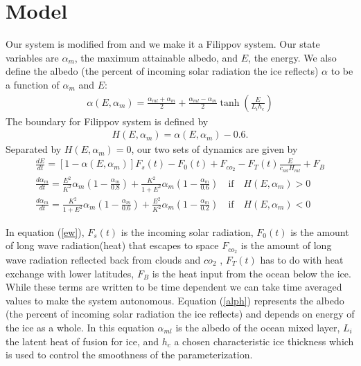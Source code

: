 \documentclass[10pt]{article}
\begin{document}
\section{Model}

Our system is modified from \cite{Eisenman09} and we make it a Filippov system. Our state variables are $\alpha_m$, the maximum attainable albedo, and $E$, the energy. We also define the albedo (the percent of incoming solar radiation the ice reflects) $\alpha$ to be a function of $\alpha_m$ and $E$:
\begin{align}
\alpha(E,\alpha_m)=\frac{\alpha_{ml}+\alpha_m}{2}+\frac{\alpha_{ml}-\alpha_m}{2}\tanh\left(\frac{E}{L_i h_{c}} \right) \label{alph}
\end{align}
The boundary for Filippov system is defined by
\begin{align}
H(E,\alpha_m)=\alpha(E,\alpha_m)-0.6 \label{H}.
\end{align}
Separated by $H(E,\alpha_m)=0$, our two sets of dynamics are given by
{\small
\begin{align}
&\frac{dE}{dt}=[1-\alpha(E,\alpha_{m})]F_s(t)-F_0(t)+F_{co_2}-F_T(t)\frac{E}{c_{ml} H_{ml}}+F_B & \label{ew}\\
&\frac{d \alpha_{m}}{dt}= \frac{E^2}{K^2}\alpha_{m}\left(1-\frac{\alpha_{m}}{0.8}\right) + \frac{K^2}{1+E^2}\alpha_{m}\left(1-\frac{\alpha_{m}}{0.6}\right) \quad \textrm{if} \quad  H(E,\alpha_m)>0 &\label{coldalph} \\
&\frac{ d \alpha_{m}}{dt}=\frac{K^2}{1+E^2}\alpha_{m}\left(1-\frac{\alpha_{m}}{0.6}\right) +\frac{E^2}{K^2}\alpha_{m}\left(1-\frac{\alpha_{m}}{0.2}\right) \quad \textrm{if}  \quad H(E,\alpha_m)<0 &\label{warmalph}
\end{align}}

In equation (\ref{ew}), $F_s(t)$ is the incoming solar radiation, $F_0(t)$ is the amount of long wave radiation(heat) that escapes to space $F_{co_2}$ is the amount of long wave radiation reflected back from clouds and $co_2$ , $F_T(t)$ has to do with heat exchange with lower latitudes, $F_B$ is the heat input from the ocean below the ice. While these terms are written to be time dependent we can take time averaged values to make the system autonomous. Equation (\ref{alph}) represents the albedo (the percent of incoming solar radiation the ice reflects) and depends on energy of the ice as a whole. In this equation $\alpha_{ml}$ is the albedo of the ocean mixed layer, $L_i$ the latent heat of fusion for ice, and $h_c$ a chosen characteristic ice thickness which is used to control the smoothness of the parameterization. 
 
\end{document}
